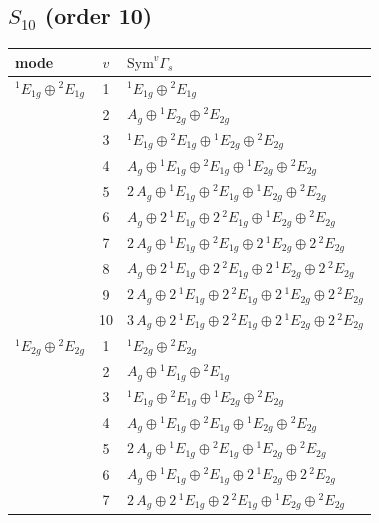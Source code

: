 \documentclass[11pt]{article}
\begin{document}
\subsection*{$S_{10}$ \quad (order 10)}
\begin{longtable}{l c p{}}
\hline mode & $v$ & $\mathrm{Sym}^v\Gamma_s$\\ \hline\endhead
${}^{1}E_{1g}\oplus {}^{2}E_{1g}$ & 1 & ${}^{1}E_{1g}\oplus {}^{2}E_{1g}$\\
 & 2 & $A_{g}\oplus {}^{1}E_{2g}\oplus {}^{2}E_{2g}$\\
 & 3 & ${}^{1}E_{1g}\oplus {}^{2}E_{1g}\oplus {}^{1}E_{2g}\oplus {}^{2}E_{2g}$\\
 & 4 & $A_{g}\oplus {}^{1}E_{1g}\oplus {}^{2}E_{1g}\oplus {}^{1}E_{2g}\oplus {}^{2}E_{2g}$\\
 & 5 & $2\,A_{g}\oplus {}^{1}E_{1g}\oplus {}^{2}E_{1g}\oplus {}^{1}E_{2g}\oplus {}^{2}E_{2g}$\\
 & 6 & $A_{g}\oplus 2\,{}^{1}E_{1g}\oplus 2\,{}^{2}E_{1g}\oplus {}^{1}E_{2g}\oplus {}^{2}E_{2g}$\\
 & 7 & $2\,A_{g}\oplus {}^{1}E_{1g}\oplus {}^{2}E_{1g}\oplus 2\,{}^{1}E_{2g}\oplus 2\,{}^{2}E_{2g}$\\
 & 8 & $A_{g}\oplus 2\,{}^{1}E_{1g}\oplus 2\,{}^{2}E_{1g}\oplus 2\,{}^{1}E_{2g}\oplus 2\,{}^{2}E_{2g}$\\
 & 9 & $2\,A_{g}\oplus 2\,{}^{1}E_{1g}\oplus 2\,{}^{2}E_{1g}\oplus 2\,{}^{1}E_{2g}\oplus 2\,{}^{2}E_{2g}$\\
 & 10 & $3\,A_{g}\oplus 2\,{}^{1}E_{1g}\oplus 2\,{}^{2}E_{1g}\oplus 2\,{}^{1}E_{2g}\oplus 2\,{}^{2}E_{2g}$\\
\hline
${}^{1}E_{2g}\oplus {}^{2}E_{2g}$ & 1 & ${}^{1}E_{2g}\oplus {}^{2}E_{2g}$\\
 & 2 & $A_{g}\oplus {}^{1}E_{1g}\oplus {}^{2}E_{1g}$\\
 & 3 & ${}^{1}E_{1g}\oplus {}^{2}E_{1g}\oplus {}^{1}E_{2g}\oplus {}^{2}E_{2g}$\\
 & 4 & $A_{g}\oplus {}^{1}E_{1g}\oplus {}^{2}E_{1g}\oplus {}^{1}E_{2g}\oplus {}^{2}E_{2g}$\\
 & 5 & $2\,A_{g}\oplus {}^{1}E_{1g}\oplus {}^{2}E_{1g}\oplus {}^{1}E_{2g}\oplus {}^{2}E_{2g}$\\
 & 6 & $A_{g}\oplus {}^{1}E_{1g}\oplus {}^{2}E_{1g}\oplus 2\,{}^{1}E_{2g}\oplus 2\,{}^{2}E_{2g}$\\
 & 7 & $2\,A_{g}\oplus 2\,{}^{1}E_{1g}\oplus 2\,{}^{2}E_{1g}\oplus {}^{1}E_{2g}\oplus {}^{2}E_{2g}$\\

\end{longtable}
\end{document}
